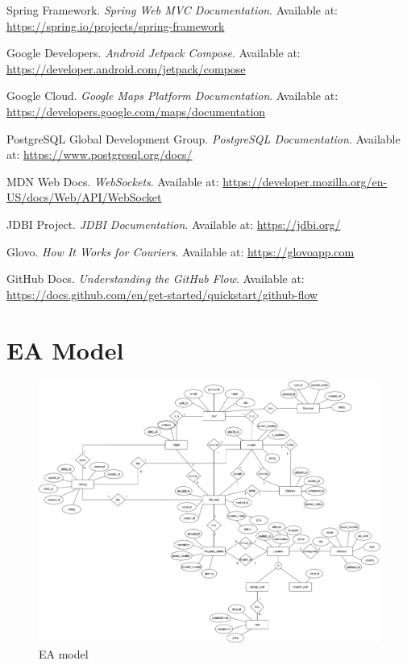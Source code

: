 \documentclass[a4paper,twoside,11pt]{article}
\begin{document}

\begin{thebibliography}{9}

Spring Framework. \textit{Spring Web MVC Documentation}. Available at: \url{https://spring.io/projects/spring-framework}

Google Developers. \textit{Android Jetpack Compose}. Available at: \url{https://developer.android.com/jetpack/compose}

Google Cloud. \textit{Google Maps Platform Documentation}. Available at: \url{https://developers.google.com/maps/documentation}

PostgreSQL Global Development Group. \textit{PostgreSQL Documentation}. Available at: \url{https://www.postgresql.org/docs/}

MDN Web Docs. \textit{WebSockets}. Available at: \url{https://developer.mozilla.org/en-US/docs/Web/API/WebSocket}

JDBI Project. \textit{JDBI Documentation}. Available at: \url{https://jdbi.org/}

Glovo. \textit{How It Works for Couriers}. Available at: \url{https://glovoapp.com}

GitHub Docs. \textit{Understanding the GitHub Flow}. Available at: \url{https://docs.github.com/en/get-started/quickstart/github-flow}

\end{thebibliography}

\newpage
\thispagestyle{empty}
\null
\newpage

\appendix

\section{EA Model}

\begin{figure}[H]
    \centering
    \includegraphics[angle=90, width=1.0\textwidth]{images/EA-model.png}
    \caption{EA model}
\end{figure}
\end{document}

